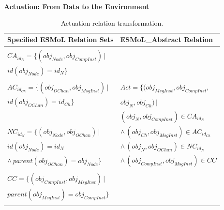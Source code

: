 \textbf{Actuation: From Data to the Environment}

\begin{table}
\centering

\begin{tabular}[width=0.5\columnwidth]{ | l | l | }
 \hline
 \textbf{Specified ESMoL Relation Sets} & \textbf{ESMoL\_Abstract Relation} \\
 \hline \hline
                                                                        & \\
 $CA_{id_N} = \{ (obj_{Node}, obj_{CompInst} ) \, |$                    & \\
 \hspace{1.7cm} $ id(obj_{Node}) = id_N \} $                            & \\
                                                                        & \\
 $AC_{id_{Ch}} = \{ (obj_{OChan}, obj_{MsgInst} ) \, |$                 & 
$ Act = \{(obj_{MsgInst}, obj_{CompInst}, $  \\
 \hspace{1.6cm} $id(obj_{OChan}) = id_{Ch} \} $                         & 
\hspace{1.3cm} $obj_{N}, obj_{Ch}) \, |$ \\
                                                                        &  
\hspace{0.8cm} $(obj_{N}, obj_{CompInst}) \in CA_{id_N}$ \\
 $NC_{id_N} = \{ (obj_{Node}, obj_{OChan}) \, | $                       & 
\hspace{0.5cm} $ \wedge \, (obj_{Ch}, obj_{MsgInst}) \in AC_{id_{Ch}}$ \\
 \hspace{1.35cm} $id(obj_{Node}) = id_N $                               &
\hspace{0.5cm} $ \wedge \, (obj_{N}, obj_{OChan}) \in NC_{id_N}$ \\ 
 \hspace{1cm} $ \wedge \, parent(obj_{OChan} ) = obj_{Node} \}$         &
\hspace{0.5cm} $ \wedge \, (obj_{CompInst}, obj_{MsgInst}) \in CC $ \\
                                                                        & \\
 $CC = \{ (obj_{CompInst}, obj_{MsgInst} ) \, | $                       & \\
 \hspace{0.7cm} $parent(obj_{MsgInst} ) = obj_{CompInst} \}$            & \\ 
                                                                        & \\
 \hline
\end{tabular}
	\caption{Actuation relation transformation.}
	\label{tab:actuation}
\end{table}

